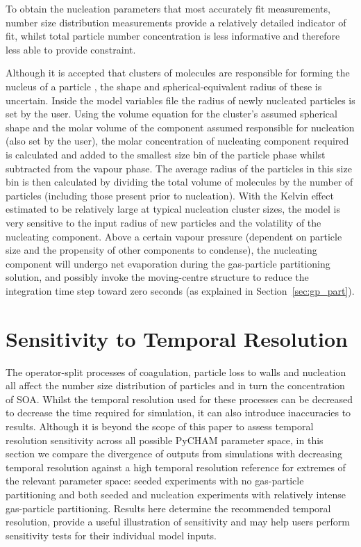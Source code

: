 \documentclass[gmd, manuscript]{copernicus}
\begin{document}
To obtain the nucleation parameters that most accurately fit measurements, number size distribution measurements provide a relatively detailed indicator of fit, whilst total particle number concentration is less informative and therefore less able to provide constraint.

Although it is accepted that clusters of molecules are responsible for forming the nucleus of a particle \citep{Seinfeld2006}, the shape and spherical-equivalent radius of these is uncertain.  Inside the model variables file the radius of newly nucleated particles is set by the user.  Using the volume equation for the cluster's assumed spherical shape and the molar volume of the component assumed responsible for nucleation (also set by the user), the molar concentration of nucleating component required is calculated and added to the smallest size bin of the particle phase whilst subtracted from the vapour phase.  The average radius of the particles in this size bin is then calculated by dividing the total volume of molecules by the number of particles (including those present prior to nucleation).  With the Kelvin effect estimated to be relatively large at typical nucleation cluster sizes, the model is very sensitive to the input radius of new particles and the volatility of the nucleating component.  Above a certain vapour pressure (dependent on particle size and the propensity of other components to condense), the nucleating component will undergo net evaporation during the gas-particle partitioning solution, and possibly invoke the moving-centre structure to reduce the integration time step toward zero seconds (as explained in Section~\ref{sec:gp_part}).

\section{Sensitivity to Temporal Resolution}\label{sec:tr_tests}

The operator-split processes of coagulation, particle loss to walls and nucleation all affect the number size distribution of particles and in turn the concentration of SOA.  Whilst the temporal resolution used for these processes can be decreased to decrease the time required for simulation, it can also introduce inaccuracies to results.  Although it is beyond the scope of this paper to assess temporal resolution sensitivity across all possible PyCHAM parameter space, in this section we compare the divergence of outputs from simulations with decreasing temporal resolution against a high temporal resolution reference for extremes of the relevant parameter space: seeded experiments with no gas-particle partitioning and both seeded and nucleation experiments with relatively intense gas-particle partitioning.  Results here determine the recommended temporal resolution, provide a useful illustration of sensitivity and may help users perform sensitivity tests for their individual model inputs.
\end{document}
